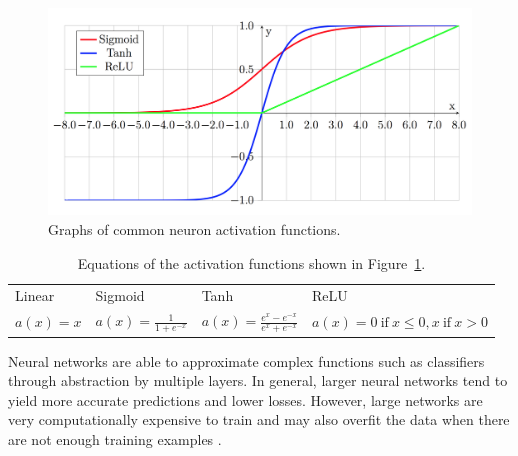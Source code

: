 \documentclass[12pt,oneside,onecolumn,a4paper]{article}
\begin{document}
\begin{figure}[H]
\begin{center}
\includegraphics[width=0.8\columnwidth]{figures/activations}
\caption{Graphs of common neuron activation functions.\label{fig:activations}}
\end{center}
\end{figure}

\begin{table}[H]
\begin{center}
\caption{Equations of the activation functions shown in Figure~\ref{fig:activations}.}
\begin{tabular}{ l | l | l | l }
 Linear & Sigmoid & Tanh & ReLU\\ 
 $a(x) = x$ & $a(x) = \frac{1}{1+e^{-x}}$ & $a(x) = \frac{e^{x}-e^{-x}}{e^{x}+e^{-x}}$ & $a(x) = 0\ \textrm{if}\ x \leq 0, x\ \textrm{if}\ x > 0$\\   
\end{tabular}
\label{table:1}
\end{center}
\end{table}

Neural networks are able to approximate complex functions such as classifiers through abstraction by multiple layers. In general, larger neural networks tend to yield more accurate predictions and lower losses. However, large networks are very computationally expensive to train and may also overfit the data when there are not enough training examples \citep{Zilouchian2001FundamentalsON}.
\end{document}
